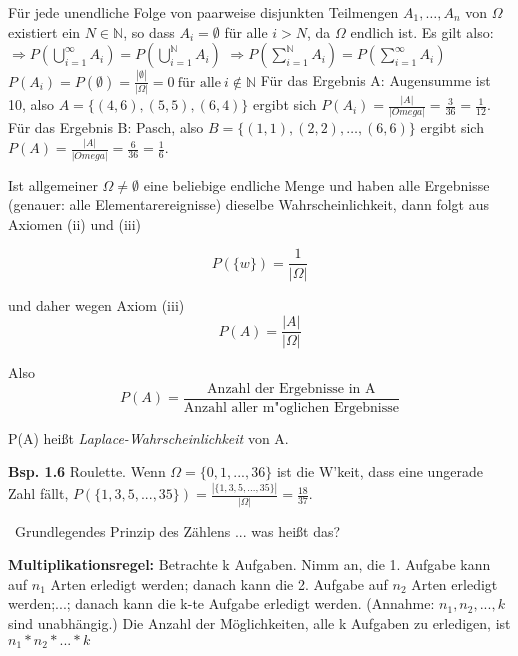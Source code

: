 \documentclass[a4paper,11pt]{article}
\begin{document}
\vspace{2pt}
\noindent Für jede unendliche Folge von paarweise disjunkten Teilmengen $A_1,\dots,A_n$ von $\Omega$ existiert ein $N\in\mathbb{N}$, so dass $A_i=\emptyset$ für alle $i>N$, da $\Omega$ endlich ist.
Es gilt also:
\newline $\Rightarrow P(\bigcup_{i=1}^{\infty}A_i)=P(\bigcup_{i=1}^{\mathbb{N}}A_i)$
\newline $\Rightarrow P(\sum_{i=1}^{\mathbb{N}}A_i)=P(\sum_{i=1}^{\infty}A_i)$
\newline $P(A_i)=P(\emptyset)=\frac{|\emptyset|}{|\Omega|}=0\ \text{für alle}\ i\notin\mathbb{N}$
\newline Für das Ergebnis A: \glqq Augensumme ist 10\grqq, also $A=\{(4,6),(5,5),(6,4)\}$ ergibt sich $P(A_i)=\frac{|A|}{|Omega|}=\frac{3}{36}=\frac{1}{12}$.
\newline Für das Ergebnis B: \glqq Pasch\grqq, also $B=\{(1,1),(2,2),\dots,(6,6)\}$ ergibt sich 
\newline$P(A)=\frac{|A|}{|Omega|}=\frac{6}{36}=\frac{1}{6}$.


\vspace{9pt}
\noindent Ist allgemeiner $\Omega \neq \emptyset$ eine beliebige endliche Menge und haben alle Ergebnisse 
(genauer: alle Elementarereignisse) dieselbe Wahrscheinlichkeit, dann folgt aus Axiomen (ii) und (iii)

\[ P(\{w\})=\frac{1}{|\Omega|} \]

\noindent und daher wegen Axiom (iii) \[ P(A)=\frac{|A|}{|\Omega|} \]

\noindent Also \[ P(A)=\frac{\text{Anzahl der Ergebnisse in A}}{\text{Anzahl aller m"oglichen Ergebnisse}} \] 

\noindent P(A) heißt \textit{Laplace-Wahrscheinlichkeit} von A.

\vspace{6pt}
\noindent\textbf{Bsp. 1.6} Roulette.
Wenn $\Omega = \{0,1,...,36\} $ ist die W'keit, dass eine ungerade Zahl fällt, $P(\{1,3,5,...,35\})=\frac{|\{1,3,5,...,35\}|}{|\Omega|} = \frac{18}{37}$.

\noindent\ Grundlegendes Prinzip des Zählens ... was heißt das?

\vspace{6pt}
\noindent\textbf{Multiplikationsregel:} Betrachte k Aufgaben. Nimm an, die 
1. Aufgabe kann auf $n_1$ Arten erledigt werden; danach kann die 
2. Aufgabe auf $n_2$ Arten erledigt werden;...; danach kann die 
k-te Aufgabe erledigt werden. (Annahme: $n_1,n_2,...,k$ sind unabhängig.) 
\newline Die Anzahl der Möglichkeiten, alle k Aufgaben zu erledigen, ist $n_1*n_2*...*k$
\end{document}
